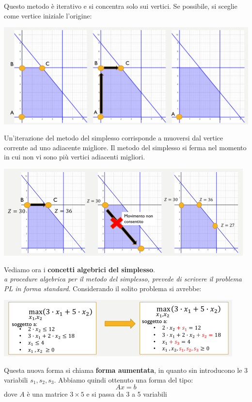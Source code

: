 \message{ !name(ro.tex)}\documentclass[a4paper,12pt, oneside]{book}
\begin{document}
Questo metodo è iterativo e si concentra solo sui vertici. Se
possibile, si sceglie come vertice iniziale l’origine:
\begin{center}
  \includegraphics[scale = 0.8]{img/simp14.png}
\end{center}
Un'iterazione del metodo del simplesso corrisponde a muoversi dal
vertice corrente ad uno adiacente migliore. Il metodo del simplesso si
ferma nel momento in cui non vi sono più vertici adiacenti migliori.
\begin{center}
  \includegraphics[scale = 0.8]{img/simp15.png}
\end{center}
Vediamo ora i \textbf{concetti algebrici del simplesso}.\\
\textit{a procedure algebrica per il metodo del simplesso, prevede di
  scrivere il problema PL in forma standard}. Considerando il solito
problema si avrebbe:
\begin{center}
  \includegraphics[scale = 1]{img/simp16.png}
\end{center}
Questa nuova forma si chiama \textbf{forma aumentata}, in quanto sin
introducono le 3 variabili $s_1, s_2, s_3$.
\newpage
Abbiamo quindi ottenuto una forma del tipo:
\[Ax=b\]
dove $A$ è una matrice $3\times 5$ e si passa da 3 a 5 variabili
\end{document}

